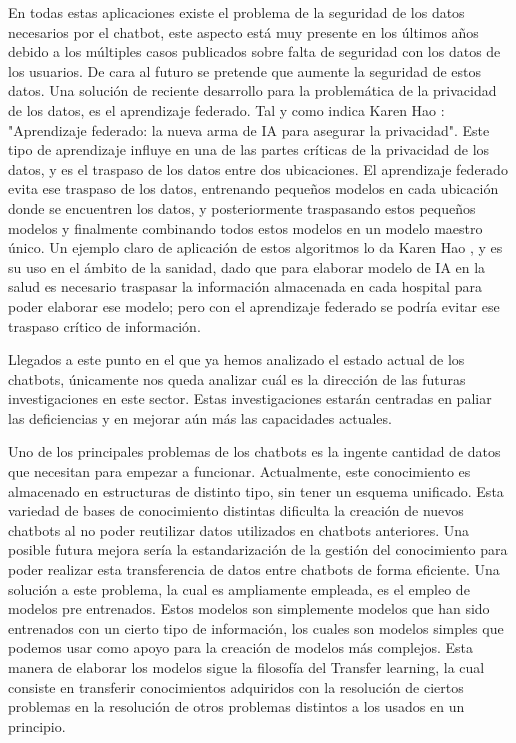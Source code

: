 En todas estas aplicaciones existe el problema de la seguridad de los datos necesarios por el chatbot, este aspecto está muy presente en los últimos años debido a los múltiples casos publicados sobre falta de seguridad con los datos de los usuarios. De cara al futuro se pretende que aumente la seguridad de estos datos. Una solución de reciente desarrollo para la problemática de la privacidad de los datos, es el aprendizaje federado. Tal y como indica Karen Hao \cite{RefWorks:RefID:42-hao1970aprendizaje}: "Aprendizaje federado: la nueva arma de IA para asegurar la privacidad". Este tipo de aprendizaje influye en una de las partes críticas de la privacidad de los datos, y es el traspaso de los datos entre dos ubicaciones. El aprendizaje federado evita ese traspaso de los datos, entrenando pequeños modelos en cada ubicación donde se encuentren los datos, y posteriormente traspasando estos pequeños modelos y finalmente combinando todos estos modelos en un modelo maestro único. Un ejemplo claro de aplicación de estos algoritmos lo da Karen Hao \cite{RefWorks:RefID:42-hao1970aprendizaje}, y es su uso en el ámbito de la sanidad, dado que para elaborar modelo de IA en la salud es necesario traspasar la información almacenada en cada hospital para poder elaborar ese modelo; pero con el aprendizaje federado se podría evitar ese traspaso crítico de información.

Llegados a este punto en el que ya hemos analizado el estado actual de los chatbots, únicamente nos queda analizar cuál es la dirección de las futuras investigaciones en este sector. Estas investigaciones estarán centradas en paliar las deficiencias y en mejorar aún más las capacidades actuales.

Uno de los principales problemas de los chatbots es la ingente cantidad de datos que necesitan para empezar a funcionar. Actualmente, este conocimiento es almacenado en estructuras de distinto tipo, sin tener un esquema unificado. Esta variedad de bases de conocimiento distintas dificulta la creación de nuevos chatbots al no poder reutilizar datos utilizados en chatbots anteriores. Una posible futura mejora sería la estandarización de la gestión del conocimiento para poder realizar esta transferencia de datos entre chatbots de forma eficiente. Una solución a este problema, la cual es ampliamente empleada, es el empleo de modelos pre entrenados. Estos modelos son simplemente modelos que han sido entrenados con un cierto tipo de información, los cuales son modelos simples que podemos usar como apoyo para la creación de modelos más complejos. Esta manera de elaborar los modelos sigue la filosofía del Transfer learning, la cual consiste en transferir conocimientos adquiridos con la resolución de ciertos problemas en la resolución de otros problemas distintos a los usados en un principio.

